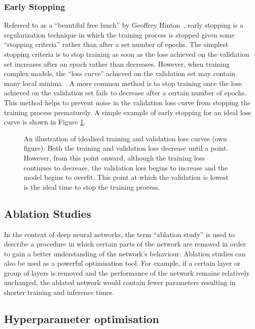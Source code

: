 \subsubsection{Early Stopping}
Referred to as a ``beautiful free lunch'' by Geoffrey Hinton~\cite[p. 141]{earlystoppinglunch}, early stopping is a regularization technique in which the training process is stopped given some ``stopping criteria'' rather than after a set number of epochs. The simplest stopping criteria is to stop training as soon as the loss achieved on the validation set increases after an epoch rather than decreases. However, when training complex models, the ``loss curve'' achieved on the validation set may contain many local minima~\cite{earlystopping}. A more common method is to stop training once the loss achieved on the validation set fails to decrease after a certain number of epochs. This method helps to prevent noise in the validation loss curve from stopping the training process prematurely. A simple example of early stopping for an ideal loss curve is shown in Figure \ref{fig:earlystop}.

\begin{figure}[t]
    \centering
    
    \caption{An illustration of idealised training and validation loss curves (own figure). Both the training and validation loss decrease until a point. However, from this point onward, although the training loss continues to decrease, the validation loss begins to increase and the model begins to overfit. This point at which the validation is lowest is the ideal time to stop the training process.}
    \label{fig:earlystop}
\end{figure}

\subsection{Ablation Studies}

In the context of deep neural networks, the term “ablation study” is used to describe a procedure in which certain parts of the network are removed in order to gain a better understanding of the network's behaviour. Ablation studies can also be used as a powerful optimisation tool. For example, if a certain layer or group of layers is removed and the performance of the network remains relatively unchanged, the ablated network would contain fewer parameters resulting in shorter training and inference times.

\subsection{Hyperparameter optimisation}
\label{sec:hyperparam}

